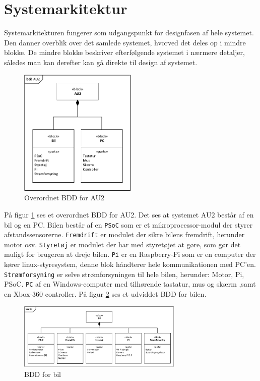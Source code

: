 \section{Systemarkitektur} \label{ch:Systemarkitektur}

Systemarkitekturen fungerer som udgangspunkt for designfasen af hele systemet.
Den danner overblik over det samlede systemet, hvorved det deles op i mindre blokke. 
De mindre blokke beskriver efterfølgende systemet i nærmere detaljer, således man kan derefter kan gå direkte til design af systemet. 

\begin{figure}[h]
\centering
\includegraphics[width=0.5\textwidth]{../fig/diagrammer/bdd_au2.pdf}
\caption{Overordnet BDD for AU2}
\label{fig:bdd_au2}
\end{figure}

På figur \ref{fig:bdd_au2} ses et overordnet BDD for AU2. 
Det ses at systemet AU2 består af en bil og en PC. 
Bilen består af en \texttt{PSoC} som er et mikroprocessor-modul der styrer afstandssensorerne. 
\texttt{Fremdrift} er modulet der sikre bilens fremdrift, herunder motor osv. 
\texttt{Styretøj} er modulet der har med styretøjet at gøre, som gør det muligt for brugeren at dreje bilen. 
\texttt{Pi} er en Raspberry-Pi som er en computer der kører linux-styresystem, denne blok håndterer hele kommunikationen med PC'en. 
\texttt{Strømforsyning} er selve strømforsyningen til hele bilen, herunder: Motor, Pi, PSoC. 
\texttt{PC} af en Windows-computer med tilhørende tastatur, mus og skærm ,samt en Xbox-360 controller. 
På figur \ref{fig:bdd_bil} ses et udviddet BDD for bilen.  

\begin{figure}[H]
\centering
\includegraphics[width=0.7\textwidth]{../fig/diagrammer/bil/bdd_bil.pdf}
\caption{BDD for bil}
\label{fig:bdd_bil}
\end{figure}

